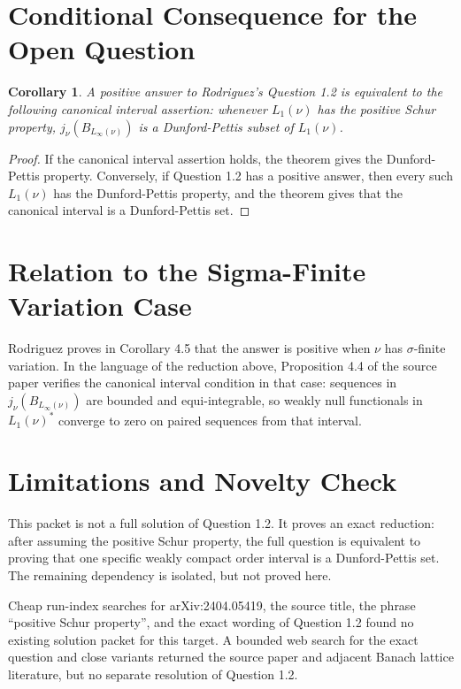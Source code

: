 \documentclass[11pt]{amsart}
\newtheorem{corollary}{Corollary}
\newcommand{\Lone}{L_1(\nu)}
\newcommand{\Linfty}{L_\infty(\nu)}
\begin{document}
\section*{Conditional Consequence for the Open Question}

\begin{corollary}
A positive answer to Rodriguez's Question 1.2 is equivalent to the following
canonical interval assertion: whenever $\Lone$ has the positive Schur property,
$j_\nu(B_{\Linfty})$ is a Dunford-Pettis subset of $\Lone$.
\end{corollary}

\begin{proof}
If the canonical interval assertion holds, the theorem gives the
Dunford-Pettis property.  Conversely, if Question 1.2 has a positive answer,
then every such $\Lone$ has the Dunford-Pettis property, and the theorem gives
that the canonical interval is a Dunford-Pettis set.
\end{proof}

\section*{Relation to the Sigma-Finite Variation Case}

Rodriguez proves in Corollary 4.5 that the answer is positive when $\nu$ has
$\sigma$-finite variation.  In the language of the reduction above, Proposition
4.4 of the source paper verifies the canonical interval condition in that
case: sequences in $j_\nu(B_{\Linfty})$ are bounded and equi-integrable, so
weakly null functionals in $\Lone^*$ converge to zero on paired sequences from
that interval.

\section*{Limitations and Novelty Check}

This packet is not a full solution of Question 1.2.  It proves an exact
reduction: after assuming the positive Schur property, the full question is
equivalent to proving that one specific weakly compact order interval is a
Dunford-Pettis set.  The remaining dependency is isolated, but not proved here.

Cheap run-index searches for arXiv:2404.05419, the source title, the phrase
``positive Schur property'', and the exact wording of Question 1.2 found no
existing solution packet for this target.  A bounded web search for the exact
question and close variants returned the source paper and adjacent Banach
lattice literature, but no separate resolution of Question 1.2.
\end{document}

